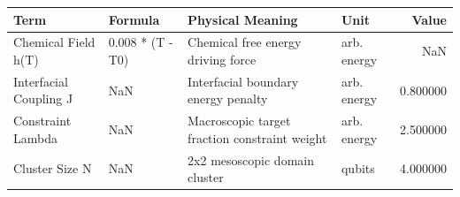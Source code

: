 \begin{tabular}{llllr}
\toprule
Term & Formula & Physical Meaning & Unit & Value \\
\midrule
Chemical Field h(T) & 0.008 * (T - T0) & Chemical free energy driving force & arb. energy & NaN \\
Interfacial Coupling J & NaN & Interfacial boundary energy penalty & arb. energy & 0.800000 \\
Constraint Lambda & NaN & Macroscopic target fraction constraint weight & arb. energy & 2.500000 \\
Cluster Size N & NaN & 2x2 mesoscopic domain cluster & qubits & 4.000000 \\
\bottomrule
\end{tabular}
